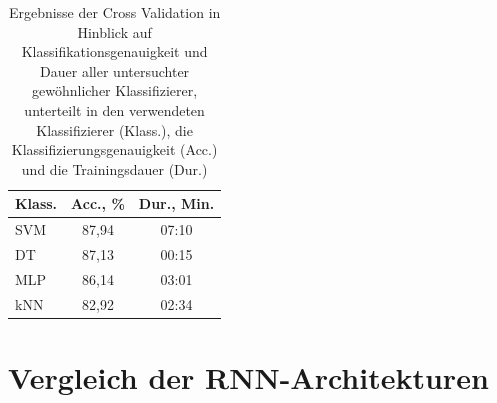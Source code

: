     \begin{table}[h]
        \centering
        \begin{tabular}{| l | c | c |}
            \hline
            \textbf{Klass.} & \textbf{Acc., \%} & \textbf{Dur., Min.} \\
            \hline
            SVM & 87,94 & 07:10 \\ \hline
            DT & 87,13 & 00:15 \\ \hline
            MLP & 86,14 & 03:01 \\ \hline
            kNN & 82,92 & 02:34 \\
            \hline
        \end{tabular}
        \caption{Ergebnisse der Cross Validation in Hinblick auf Klassifikationsgenauigkeit und Dauer aller untersuchter gewöhnlicher Klassifizierer, unterteilt in den verwendeten Klassifizierer (Klass.), die Klassifizierungsgenauigkeit (Acc.) und die Trainingsdauer (Dur.)}
        \label{tab:other-classifiers-comp}
    \end{table}

\section{Vergleich der RNN-Architekturen}
\label{sec:rnn-comp}

